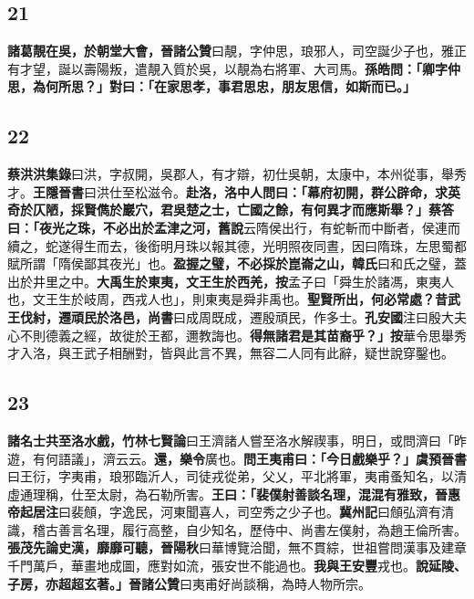 \subsection*{21}

\textbf{諸葛靚在吳，於朝堂大會，}{\footnotesize \textbf{晉諸公贊}曰靚，字仲思，琅邪人，司空誕少子也，雅正有才望，誕以壽陽叛，遣靚入質於吳，以靚為右將軍、大司馬。}\textbf{孫皓問：「卿字仲思，為何所思？」對曰：「在家思孝，事君思忠，朋友思信，如斯而已。」}

\subsection*{22}

\textbf{蔡洪}{\footnotesize \textbf{洪集錄}曰洪，字叔開，吳郡人，有才辯，初仕吳朝，太康中，本州從事，舉秀才。\textbf{王隱晉書}曰洪仕至松滋令。}\textbf{赴洛，洛中人問曰：「幕府初開，群公辟命，求英奇於仄陋，採賢儁於巖穴，君吳楚之士，亡國之餘，有何異才而應斯舉？」蔡答曰：「夜光之珠，不必出於孟津之河，}{\footnotesize \textbf{舊說}云隋侯出行，有蛇斬而中斷者，侯連而續之，蛇遂得生而去，後銜明月珠以報其德，光明照夜同晝，因曰隋珠，左思蜀都賦所謂「隋侯鄙其夜光」也。}\textbf{盈握之璧，不必採於崑崙之山，}{\footnotesize \textbf{韓氏}曰和氏之璧，蓋出於井里之中。}\textbf{大禹生於東夷，文王生於西羌，}{\footnotesize \textbf{按}孟子曰「舜生於諸馮，東夷人也，文王生於岐周，西戎人也」，則東夷是舜非禹也。}\textbf{聖賢所出，何必常處？昔武王伐紂，遷頑民於洛邑，}{\footnotesize \textbf{尚書}曰成周既成，遷殷頑民，作多士。\textbf{孔安國}注曰殷大夫心不則德義之經，故徙於王都，邇教誨也。}\textbf{得無諸君是其苗裔乎？」}{\footnotesize \textbf{按}華令思舉秀才入洛，與王武子相酬對，皆與此言不異，無容二人同有此辭，疑世說穿鑿也。}

\subsection*{23}

\textbf{諸名士共至洛水戲，}{\footnotesize \textbf{竹林七賢論}曰王濟諸人嘗至洛水解禊事，明日，或問濟曰「昨遊，有何語議」，濟云云。}\textbf{還，樂令}{\footnotesize 廣也。}\textbf{問王夷甫曰：「今日戲樂乎？」}{\footnotesize \textbf{虞預晉書}曰王衍，字夷甫，琅邪臨沂人，司徒戎從弟，父乂，平北將軍，夷甫蚤知名，以清虛通理稱，仕至太尉，為石勒所害。}\textbf{王曰：「裴僕射善談名理，混混有雅致，}{\footnotesize \textbf{晉惠帝起居注}曰裴頠，字逸民，河東聞喜人，司空秀之少子也。\textbf{冀州記}曰頠弘濟有清識，稽古善言名理，履行高整，自少知名，歷侍中、尚書左僕射，為趙王倫所害。}\textbf{張茂先論史漢，靡靡可聽，}{\footnotesize \textbf{晉陽秋}曰華博覽洽聞，無不貫綜，世祖嘗問漢事及建章千門萬戶，華畫地成圖，應對如流，張安世不能過也。}\textbf{我與王安豐}{\footnotesize 戎也。}\textbf{說延陵、子房，亦超超玄著。」}{\footnotesize \textbf{晉諸公贊}曰夷甫好尚談稱，為時人物所宗。}

